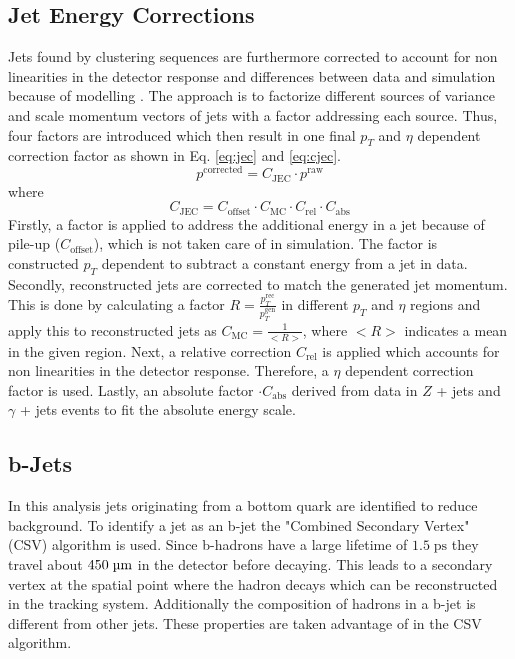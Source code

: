 \subsection{Jet Energy Corrections}
\label{sec:jec}
	Jets found by clustering sequences are furthermore corrected to account for non linearities in the detector response and differences between data and simulation because of modelling \cite{JEC}. The approach is to factorize different sources of variance and scale momentum vectors of jets with a factor addressing each source. Thus, four factors are introduced which then result in one final $p_T$ and $\eta$ dependent correction factor as shown in Eq. \ref{eq:jec} and \ref{eq:cjec}.
	\begin{equation}
	p^{\text{corrected}} = C_{\text{JEC}} \cdot p^{\text{raw}}
	\label{eq:jec}
	\end{equation}
	where
	\begin{equation}
	C_{\text{JEC}} = C_{\text{offset}} \cdot C_{\text{MC}} \cdot C_{\text{rel}} \cdot C_{\text{abs}}
	\label{eq:cjec}
	\end{equation}
	Firstly, a factor is applied to address the additional energy in a jet because of pile-up ($C_{\text{offset}}$), which is not taken care of in simulation. The factor is constructed $p_T$ dependent to subtract a constant energy from a jet in data. Secondly, reconstructed jets are corrected to match the generated jet momentum. This is done by calculating a factor $R=\frac{p_T^{\text{rec}}}{p_T^{\text{gen}}}$ in different $p_T$ and $\eta$ regions and apply this to reconstructed jets as $C_{\text{MC}} = \frac{1}{<R>}$, where $<R>$ indicates a mean in the given region. Next, a relative correction $C_{\text{rel}}$ is applied which accounts for non linearities in the detector response. Therefore, a $\eta$ dependent correction factor is used. Lastly, an absolute factor $\cdot C_{\text{abs}}$ derived from data in $Z$ + jets and $\gamma$ + jets events to fit the absolute energy scale.

\subsection{b-Jets}
\label{sec:btag}
	In this analysis jets originating from a bottom quark are identified to reduce background. To identify a jet as an b-jet the "Combined Secondary Vertex" (CSV) algorithm is used. Since b-hadrons have a large lifetime of $1.5\;\text{ps}$ they travel about $450\;\text{\textmu m}$ in the detector before decaying. This leads to a secondary vertex at the spatial point where the hadron decays which can be reconstructed in the tracking system. Additionally the composition of hadrons in a b-jet is different from other jets.
	These properties are taken advantage of in the CSV algorithm. 
	
